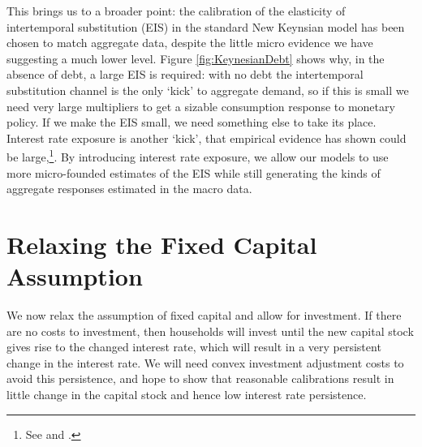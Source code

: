 \documentclass[12pt,a4paper]{article}
\begin{document}
This brings us to a broader point: the calibration of the elasticity of intertemporal substitution (EIS) in the standard New Keynsian model has been chosen to match aggregate data, despite the little micro evidence we have suggesting a much lower level. Figure \ref{fig:KeynesianDebt} shows why, in the absence of debt, a large EIS is required: with no debt the intertemporal substitution channel is the only `kick' to aggregate demand, so if this is small we need very large multipliers to get a sizable consumption response to monetary policy. If we make the EIS small, we need something else to take its place. Interest rate exposure is another `kick', that empirical evidence has shown could be large,\footnote{See \cite{auclert_monetary_2017} and \cite{ckConsumption}.}. By introducing interest rate exposure, we allow our models to use more micro-founded estimates of the EIS while still generating the kinds of aggregate responses estimated in the macro data.

\section{Relaxing the Fixed Capital Assumption}
We now relax the assumption of fixed capital and allow for investment. If there are no costs to investment, then households will invest until the new capital stock gives rise to the changed interest rate, which will result in a very persistent change in the interest rate. We will need convex investment adjustment costs to avoid this persistence, and hope to show that reasonable calibrations result in little change in the capital stock and hence low interest rate persistence.
\end{document}

